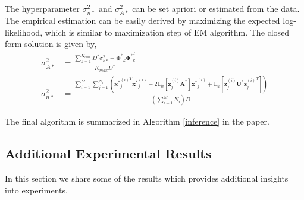 \documentclass[runningheads]{llncs}
\begin{document}
The hyperparameter $\sigma_{n*}^2$ and $\sigma_{A*}^2$ can be set apriori or estimated from the data. The empirical estimation can be easily derived by maximizing the expected log-likelihood, which is similar to maximization step of EM algorithm. The closed form solution is given by,
\begin{align}
\sigma_{A*}^2 &= \frac{\sum_{k=1}^{K_{max}} D^*\sigma_{k*}^2 + \mathbf{\Phi^*}_k\mathbf{\Phi^*}_k^T}{K_{max}D^*} \label{eq26}\\
\sigma_{n*}^2 &= \frac{\sum_{i=1}^M\sum_{j=1}^{N_i} \left({\mathbf{x^*}_j^{(i)}}^T\mathbf{x^*}_j^{(i)} -2 \mathbb{E}_{\tilde{w}}[\mathbf{z}_{j.}^{(i)}\mathbf{A^*}]\mathbf{x^*}_j^{(i)} + \mathbb{E}_{\tilde{w}}[\mathbf{z}_{j.}^{(i)}\mathbf{U^*}{\mathbf{z}_{j.}^{(i)}}^T]\right)}{(\sum_{i=1}^M N_i) D} \label{eq27}
\end{align}

The final algorithm is summarized in Algorithm \ref{inference} in the paper.

\subsection{Additional Experimental Results}

In this section we share some of the results which provides additional insights into experiments.
\end{document}
